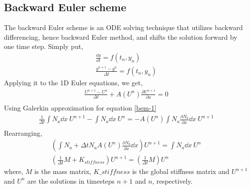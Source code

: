 \documentclass[12pt, oneside]{article}
\begin{document}
\subsection{Backward Euler scheme}
The backward Euler scheme is an ODE solving technique that utilizes backward differencing, hence backward Euler method, and shifts the solution forward by one time step. Simply put,
\begin{equation}
    \begin{gathered}
	\frac{\dd y}{\dd t} = f \left( t_n, y_n \right) \\
	\frac{y^{n+1} - y^n}{\Delta t} = f \left( t_n, y_n \right) 
    \end{gathered}
    \label{bem}
\end{equation}
Applying it to the 1D Euler equations, we get,
\begin{equation}
    \begin{gathered}
	\frac {U^{n+1} - U^n} {\Delta t} + A(U^n) \frac {\partial U^{n+1}} { \partial x} = 0\\
	\label{bem-1}
    \end{gathered}
\end{equation}
Using Galerkin approximation for equation \ref{bem-1}
\begin{equation}
    \begin{gathered}
	\frac{1}{\Delta t} \int N_a \dd x\ U^{n+1} - \int N_a \dd x\ U^n = - A(U^n) \int N_a  \frac {\partial N_b} { \partial x} \dd x\ U^{n+1} \\
    \end{gathered}
\end{equation}
Rearranging, 
\begin{equation}
    \begin{gathered}
	\left( \int N_a + \Delta t N_a A(U^n) \frac {\partial N_b} { \partial x} \dd x \right) U^{n+1} =  \int N_a \dd x\ U^n \\ 
	\left( \frac{1}{\Delta t} M + K_{stiffness} \right) U^{n+1} = \left( \frac{1}{\Delta t} M \right) U^n  
    \end{gathered}
\end{equation}
where, $M$ is the mass matrix, $K\_stiffness$ is the global stiffness matrix and $U^{n+1}$ and $U^n$ are the solutions in timesteps $n+1$ and $n$, respectively. 
\end{document}
